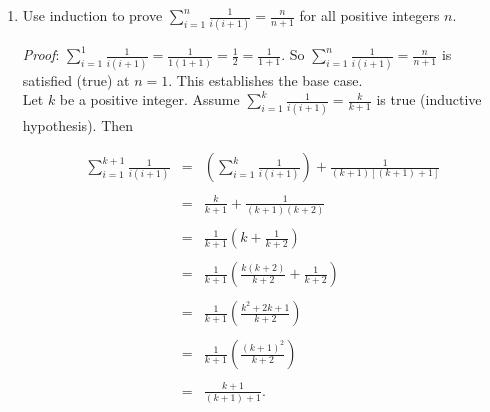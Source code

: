 \documentclass[12pt]{amsart}
\theoremstyle{definition}
\theoremstyle{remark}
\begin{document}
\begin{enumerate}
\medskip

\hspace{0.5cm} (v)  Then $a+b=b$ by canceling the common factor $(a-b)$ from both sides.

\medskip

\hspace{0.5cm} (vi)  Then $2b=b$ by substitution.

\medskip

\hspace{0.5cm} (vii)  Then $2=1$ canceling the common factor $b$ from both sides $\mbox{ }_{\square}$\\

{\color{red}  The issue with this proof is that step v is invalid.  The quantity $a-b$ is zero; we cannot cancel it!}


\newpage



\item Use induction to prove $\displaystyle \sum_{i=1}^n \frac{1}{i(i+1)}=\frac{n}{n+1}$ for all positive integers $n$.\\

{\color{red} \emph{Proof}: $\displaystyle \sum_{i=1}^1 \frac{1}{i(i+1)}=\frac{1}{1(1+1)}=\frac{1}{2}=\frac{1}{1+1}$.  So $\displaystyle \sum_{i=1}^n \frac{1}{i(i+1)}=\frac{n}{n+1}$ is satisfied (true) at $n=1$.  This establishes the base case.\\

Let $k$ be a positive integer.  Assume $\displaystyle \sum_{i=1}^k \frac{1}{i(i+1)}=\frac{k}{k+1}$ is true (inductive hypothesis).  Then

\begin{eqnarray*}
\sum_{i=1}^{k+1} \frac{1}{i(i+1)} &=& \left(\sum_{i=1}^k \frac{1}{i(i+1)}\right) +\frac{1}{(k+1)[(k+1)+1]} \\
\\
&=& \frac{k}{k+1}+\frac{1}{(k+1)(k+2)} \\
\\
&=& \frac{1}{k+1}\left(k+\frac{1}{k+2}\right) \\
\\
&=& \frac{1}{k+1}\left(\frac{k(k+2)}{k+2}+\frac{1}{k+2}\right) \\
\\
&=& \frac{1}{k+1}\left(\frac{k^2+2k+1}{k+2}\right) \\
\\
&=& \frac{1}{k+1}\left(\frac{(k+1)^2}{k+2}\right) \\
\\
&=& \frac{k+1}{(k+1)+1}.\end{eqnarray*}

}
\end{enumerate}
\end{document}
